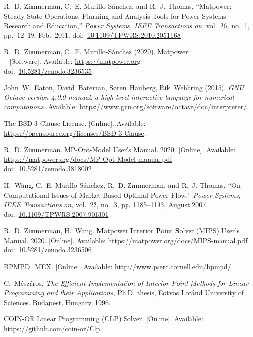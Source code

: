 \documentclass[12pt]{article}
\newcommand{\matpower}[0]{{\sc Matpower}}
\newcommand{\mips}[0]{{MIPS}}
\newcommand{\mipsname}[0]{{{\bf M}{\sc atpower} \textbf{I}nterior \textbf{P}oint \textbf{S}olver}}
\newcommand{\mpom}[0]{\mbox{MP-Opt-Model}}
\newcommand{\mpomname}[0]{\mpom{}}
\newcommand{\doi}[1]{doi:~\href{https://doi.org/#1}{#1}}
\numberwithin{equation}{section}
\numberwithin{table}{section}
\numberwithin{figure}{section}
\begin{document}
\clearpage
\begin{thebibliography}{99}
R.~D. Zimmerman, C.~E. Murillo-S{\'a}nchez, and R.~J. Thomas, ``\matpower{}: Steady-State Operations, Planning and Analysis Tools for Power Systems Research and Education,'' \emph{Power Systems, IEEE Transactions on}, vol.~26, no.~1, pp.~12--19, Feb.~2011.
\doi{10.1109/TPWRS.2010.2051168}

R.~D. Zimmerman, C.~E. Murillo-S{\'a}nchez (2020). \matpower{}\\~
[Software]. Available: \url{https://matpower.org}\\
\doi{10.5281/zenodo.3236535}

John~W.~Eaton, David~Bateman, S{\o}ren~Hauberg, Rik~Wehbring (2015). \emph{GNU Octave version 4.0.0 manual: a high-level interactive language for numerical computations.} Available: \url{https://www.gnu.org/software/octave/doc/interpreter/}.

The BSD 3-Clause License. [Online]. Available: \url{https://opensource.org/licenses/BSD-3-Clause}.

R.~D. Zimmerman. \mpomname{} User's Manual. 2020.
[Online]. Available: \url{https://matpower.org/docs/MP-Opt-Model-manual.pdf}\\
\doi{10.5281/zenodo.3818002}

H.~Wang, C.~E. Murillo-S{\'a}nchez, R.~D. Zimmerman, and R.~J. Thomas, ``On
Computational Issues of Market-Based Optimal Power Flow,'' \emph{Power
Systems, IEEE Transactions on}, vol.~22, no.~3, pp. 1185--1193, August 2007.
\doi{10.1109/TPWRS.2007.901301}

R.~D. Zimmerman, H.~Wang. \mipsname{} (\mips{}) User's Manual. 2020.
[Online]. Available: \url{https://matpower.org/docs/MIPS-manual.pdf}\\
\doi{10.5281/zenodo.3236506}

BPMPD\_MEX. [Online]. Available:
  \url{http://www.pserc.cornell.edu/bpmpd/}.

C.~M{\'e}sz{\'a}ros, \emph{The Efficient Implementation of Interior Point Methods for Linear Programming and their Applications}, Ph.D. thesis,
  E{\"o}tv{\"o}s Lor{\'a}nd University of Sciences, Budapest, Hungary, 1996.

COIN-OR Linear Programming (CLP) Solver. [Online]. Available:
  \url{https://github.com/coin-or/Clp}.


\end{thebibliography}
\end{document}
